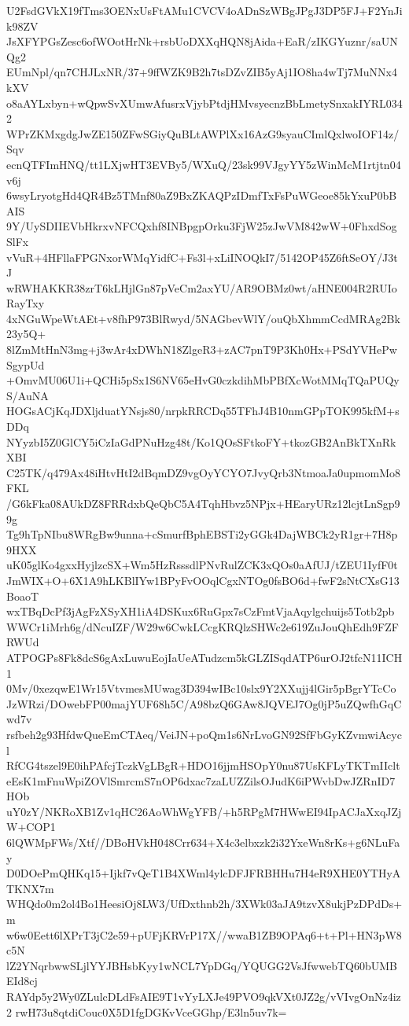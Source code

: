 U2FsdGVkX19fTms3OENxUsFtAMu1CVCV4oADnSzWBgJPgJ3DP5FJ+F2YnJik98ZV
JsXFYPGsZesc6ofWOotHrNk+rsbUoDXXqHQN8jAida+EaR/zIKGYuznr/saUNQg2
EUmNpl/qn7CHJLxNR/37+9ffWZK9B2h7tsDZvZIB5yAj1IO8ha4wTj7MuNNx4kXV
o8aAYLxbyn+wQpwSvXUmwAfusrxVjybPtdjHMvsyecnzBbLmetySnxakIYRL0342
WPrZKMxgdgJwZE150ZFwSGiyQuBLtAWPlXx16AzG9syauCImlQxlwoIOF14z/Sqv
ecnQTFImHNQ/tt1LXjwHT3EVBy5/WXuQ/23sk99VJgyYY5zWinMcM1rtjtn04v6j
6wsyLryotgHd4QR4Bz5TMnf80aZ9BxZKAQPzIDmfTxFsPuWGeoe85kYxuP0bBAIS
9Y/UySDIIEVbHkrxvNFCQxhf8INBpgpOrku3FjW25zJwVM842wW+0FhxdSogSlFx
vVuR+4HFllaFPGNxorWMqYidfC+Fs3l+xLiINOQkI7/5142OP45Z6ftSeOY/J3tJ
wRWHAKKR38zrT6kLHjlGn87pVeCm2axYU/AR9OBMz0wt/aHNE004R2RUIoRayTxy
4xNGuWpeWtAEt+v8fhP973BlRwyd/5NAGbevWlY/ouQbXhmmCcdMRAg2Bk23y5Q+
8lZmMtHnN3mg+j3wAr4xDWhN18ZlgeR3+zAC7pnT9P3Kh0Hx+PSdYVHePwSgypUd
+OmvMU06U1i+QCHi5pSx1S6NV65eHvG0czkdihMbPBfXcWotMMqTQaPUQyS/AuNA
HOGsACjKqJDXljduatYNsjs80/nrpkRRCDq55TFhJ4B10nmGPpTOK995kfM+sDDq
NYyzbI5Z0GlCY5iCzIaGdPNuHzg48t/Ko1QOsSFtkoFY+tkozGB2AnBkTXnRkXBI
C25TK/q479Ax48iHtvHtI2dBqmDZ9vgOyYCYO7JvyQrb3NtmoaJa0upmomMo8FKL
/G6kFka08AUkDZ8FRRdxbQeQbC5A4TqhHbvz5NPjx+HEaryURz12lcjtLnSgp99g
Tg9hTpNIbu8WRgBw9unna+cSmurfBphEBSTi2yGGk4DajWBCk2yR1gr+7H8p9HXX
uK05glKo4gxxHyjlzcSX+Wm5HzRsssdlPNvRulZCK3xQOs0aAfUJ/tZEU1IyfF0t
JmWIX+O+6X1A9hLKBlIYw1BPyFvOOqlCgxNTOg0fsBO6d+fwF2sNtCXsG13BoaoT
wxTBqDcPf3jAgFzXSyXH1iA4DSKux6RuGpx7sCzFmtVjaAqylgchuijs5Totb2pb
WWCr1iMrh6g/dNcuIZF/W29w6CwkLCcgKRQlzSHWc2e619ZuJouQhEdh9FZFRWUd
ATPOGPs8Fk8dcS6gAxLuwuEojIaUeATudzcm5kGLZISqdATP6urOJ2tfcN11ICH1
0Mv/0xezqwE1Wr15VtvmesMUwag3D394wIBc10slx9Y2XXujj4lGir5pBgrYTcCo
JzWRzi/DOwebFP00majYUF68h5C/A98bzQ6GAw8JQVEJ7Og0jP5uZQwfhGqCwd7v
rsfbeh2g93HfdwQueEmCTAeq/VeiJN+poQm1s6NrLvoGN92SfFbGyKZvmwiAcycl
RfCG4tszel9E0ihPAfcjTczkVgLBgR+HDO16jjmHSOpY0nu87UsKFLyTKTmIIclt
eEsK1mFnuWpiZOVlSmrcmS7nOP6dxac7zaLUZZilsOJudK6iPWvbDwJZRnID7HOb
uY0zY/NKRoXB1Zv1qHC26AoWhWgYFB/+h5RPgM7HWwEI94IpACJaXxqJZjW+COP1
6lQWMpFWs/Xtf//DBoHVkH048Crr634+X4c3elbxzk2i32YxeWn8rKs+g6NLuFay
D0DOePmQHKq15+Ijkf7vQeT1B4XWml4ylcDFJFRBHHu7H4eR9XHE0YTHyATKNX7m
WHQdo0m2ol4Bo1HeesiOj8LW3/UfDxthnb2h/3XWk03aJA9tzvX8ukjPzDPdDs+m
w6w0Eett6lXPrT3jC2e59+pUFjKRVrP17X//wwaB1ZB9OPAq6+t+Pl+HN3pW8c5N
lZ2YNqrbwwSLjlYYJBHsbKyy1wNCL7YpDGq/YQUGG2VsJfwwebTQ60bUMBEId8cj
RAYdp5y2Wy0ZLulcDLdFsAIE9T1vYyLXJe49PVO9qkVXt0JZ2g/vVIvgOnNz4iz2
rwH73u8qtdiCouc0X5D1fgDGKvVceGGhp/E3ln5uv7k=
